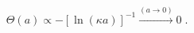\begin{equation}
\Theta  (a) \propto - [\ln (\kappa a)]^{-1} \stackrel{(a \rightarrow 0)}{\rightarrow} 0
\; .
\label{eq:asymptotic_freedom}
\end{equation}

